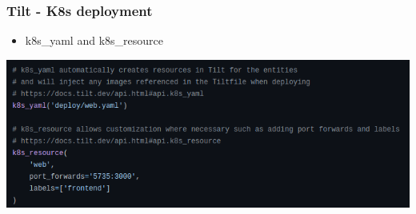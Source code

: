 \subsubsection{Tilt - K8s deployment}
\begin{frame}[fragile]{\subsubsecname}
  \begin{itemize}
    \item  k8s\_yaml and k8s\_resource
  \end{itemize}
  \includegraphics[width=1\linewidth]{assets/tilt-func-k8s_deploy}
\end{frame}
